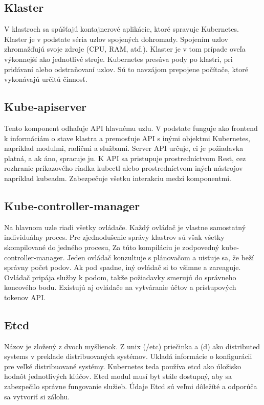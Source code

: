 \subsection*{Klaster}
V klastroch sa spúšťajú kontajnerové aplikácie, ktoré spravuje Kubernetes. Klaster je v podstate séria uzlov spojených dohromady. Spojením uzlov zhromažďujú svoje zdroje (CPU, RAM, atď.). Klaster je v tom prípade oveľa výkonnejší ako jednotlivé stroje. Kubernetes presúva pody po klastri, pri pridávaní alebo odstraňovaní uzlov.\cite{kubernetes2} Sú to navzájom prepojene počítače, ktoré vykonávajú určitú činnosť.

\subsection*{Kube-apiserver}
Tento komponent odhaľuje API hlavnému uzlu. V podstate funguje ako frontend k informáciám o stave klastra a premosťuje API s inými objektmi Kubernetes, napríklad modulmi, radičmi a službami. Server API určuje, ci je požiadavka platná, a ak áno, spracuje ju. K API sa pristupuje prostredníctvom Rest, cez rozhranie príkazového riadka kubectl alebo prostredníctvom iných nástrojov napríklad kubeadm. Zabezpečuje všetku interakciu medzi komponentmi.\cite{kubeapiserver}

\subsection*{Kube-controller-manager}
Na hlavnom uzle riadi všetky ovládače. Každý ovládač je vlastne samostatný individuálny proces. Pre zjednodušenie správy klastrov sú však všetky skompilované do jedného procesu, Za túto kompiláciu je zodpovedný kube-controller-manager. Jeden ovládač konzultuje s plánovačom a uisťuje sa, že beží správny počet podov. Ak pod spadne, iný ovládač si to všimne a zareaguje. Ovládač pripája služby k podom, takže požiadavky smerujú do správneho koncového bodu. Existujú aj ovládače na vytváranie účtov a prístupových tokenov API.\cite{kubecontroler}

\subsection*{Etcd}
Názov je zložený z dvoch myšlienok. Z unix (/etc) priečinka a (d) ako distributed systems v preklade distribuovaných systémov. Ukladá informácie o konfigurácii pre veľké distribuované systémy. Kubernetes teda používa etcd ako úložisko hodnôt jednotlivých kľúčov. Etcd modul musí byt stále dostupný, aby sa zabezpečilo správne fungovanie služieb. Údaje Etcd sú veľmi dôležíté a odporúča sa vytvoriť si zálohu.

